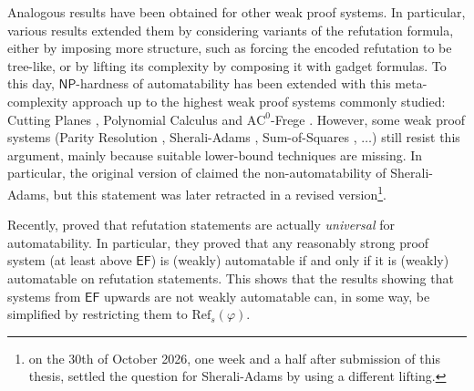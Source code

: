 Analogous results have been obtained for other weak proof systems. In particular, various results \cite{alg_nphard,resk_nphard,cp_nphard,obdd_nphard,ac0f_nphard} extended them by considering variants of the refutation formula, either by imposing more structure, such as forcing the encoded refutation to be tree-like, or by lifting its complexity by composing it with gadget formulas. To this day, $\mathsf{NP}$-hardness of automatability has been extended with this meta-complexity approach up to the highest weak proof systems commonly studied: Cutting Planes \cite{cp_nphard}, Polynomial Calculus \cite{alg_nphard} and $\mathrm{AC}^0$-Frege \cite{ac0f_nphard}. However, some weak proof systems (Parity Resolution \cite{res_parity}, Sherali-Adams \cite{sherali_adams}, Sum-of-Squares \cite{sos},  $\ldots$) still resist this argument, mainly because suitable lower-bound techniques are missing. In particular, the original version of \cite{alg_nphard} claimed the non-automatability of Sherali-Adams, but this statement was later retracted in a revised version\footnote{on the 30th of October 2026, one week and a half after submission of this thesis, \textcite{sa_nphard} settled the question for Sherali-Adams by using a different lifting.}.

Recently, \textcite{pap} proved that refutation statements are actually \textit{universal} for automatability. In particular, they proved that any reasonably strong proof system (at least above $\mathsf{EF}$) is (weakly) automatable if and only if it is (weakly) automatable on refutation statements. This shows that the results showing that systems from $\mathsf{EF}$ upwards are not weakly automatable can, in some way, be simplified by restricting them to $\mathrm{Ref}_s(\varphi)$. 


\cleardoublepage
